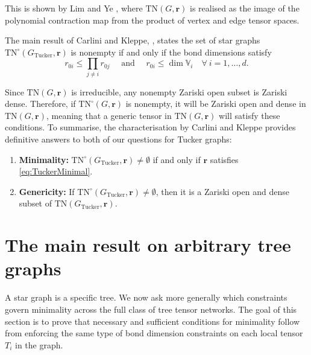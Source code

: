 \documentclass{amsart}
\theoremstyle{plain}
\theoremstyle{definition}
\theoremstyle{remark}
\begin{document}
This is shown by Lim and Ye \cite[Proposition 2.5]{limandye}, where $\mathrm{TN}(G, \mathbf{r})$ is realised as the image of the polynomial contraction map from the product of vertex and edge tensor spaces. 

The main result of Carlini and Kleppe, \cite[Theorem 7]{carlinikleppe}, states the set of star graphs $\mathrm{TN}^\circ(G_\text{Tucker}, \mathbf r)$ is nonempty if and only if the bond dimensions satisfy
\begin{equation} \label{eq:TuckerMinimal}
r_{0i} \le \prod_{j \ne i} r_{0j} \quad \text{ and } \quad r_{0i} \le \dim \mathbb V_i \quad \forall \ i = 1,\dots,d .
\end{equation}

Since $\mathrm{TN}(G, \mathbf r)$ is irreducible, any nonempty Zariski open subset is Zariski dense. Therefore, if $\mathrm{TN}^\circ(G, \mathbf r)$ is nonempty, it will be Zariski open and dense in $\mathrm{TN}(G, \mathbf r)$, meaning that a generic tensor in $\mathrm{TN}(G, \mathbf r)$ will satisfy these conditions. To summarise, the characterisation by Carlini and Kleppe \cite{carlinikleppe} provides definitive answers to both of our questions for Tucker graphs:

\begin{enumerate}[label=A\arabic*]
    \item \textbf{Minimality:} $\mathrm{TN}^\circ(G_{\text{Tucker}}, \mathbf{r}) \neq \emptyset$ if and only if $\mathbf{r}$ satisfies \eqref{eq:TuckerMinimal}.

    \item \textbf{Genericity:} If $\mathrm{TN}^\circ(G_{\text{Tucker}}, \mathbf{r}) \neq \emptyset$, then it is a Zariski open and dense subset of $\mathrm{TN}(G_{\text{Tucker}}, \mathbf{r})$. 
\end{enumerate}

\section{The main result on arbitrary tree graphs}\label{sec:main}
A star graph is a specific tree. We now ask more generally which constraints govern minimality across the full class of tree tensor networks. The goal of this section is to prove that necessary and sufficient conditions for minimality follow from enforcing the same type of bond dimension constraints on each local tensor $T_i$ in the graph.
\end{document}
